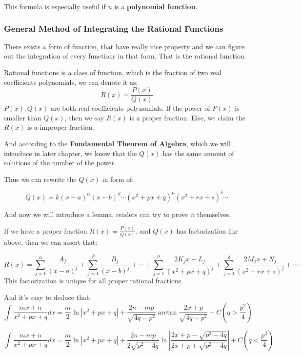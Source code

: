 \documentclass[oneside]{book}
\begin{document}
This formula is especially useful if $u$ is a \textbf{polynomial function}.

\subsubsection{General Method of Integrating the Rational Functions}

There exists a form of function, that have really nice property and we can figure out the integration of every functions in that form. That is the rational function.

\begin{definition}
Rational functions is a class of function, which is the fraction of two real coefficients polynomials, we can denote it as:
\[
R(x) = \frac{P(x)}{Q(x)}
\]
$P(x),Q(x)$ are both real coefficients polynomials. If the power of $P(x)$ is smaller than $Q(x)$, then we say $R(x)$ is a proper fraction. Else, we claim the $R(x)$ is a improper fraction.
\end{definition}

And according to the \textbf{Fundamental Theorem of Algebra}, which we will introduce in later chapter, we know that the $Q(x)$ has the same amount of solutions of the number of the power.

Thus we can rewrite the $Q(x)$ in form of:

\[
Q(x) = k (x-a)^{\alpha} (x-b)^{\beta} \cdots (x^2 + px + q)^{\mu} (x^2 + rx + s)^{\delta} \cdots
\]

And now we will introduce a lemma, readers can try to prove it themselves.

\begin{lemma}
If we have a proper fraction $R(x) = \frac{P(x)}{Q(x)}$. and $Q(x)$ has factorization like above, then we can assert that:

\[
R(x) = \sum_{j=1}^{\alpha} \frac{A_j}{(x-a)^j} + \sum_{j=1}^{\beta} \frac{B_j}{(x-b)^j} + \cdots + \sum_{j=1}^{\mu} \frac{2K_jx + L_j}{(x^2 + px +q)^j} + \sum_{j=1}^{\delta} \frac{2M_jx + N_j}{(x^2 + rx +s)^j} + \cdots
\]
This factorization is unique for all proper rational fractions.
\end{lemma}

And it's easy to deduce that:
\[
\int \frac{mx+n}{x^2 + px + q} dx = \frac{m}{2} \ln |x^2 + px + q| + \frac{2n-mp}{\sqrt{4q - p^2}} \arctan \frac{2x + p}{\sqrt{4q - p^2}} + C (q > \frac{p^2}{4})
\]

\[
\int \frac{mx+n}{x^2 + px + q} dx = \frac{m}{2} \ln |x^2 + px + q| + \frac{2n-mp}{2\sqrt{p^2 - 4q}} \ln \left| \frac{2x + p - \sqrt{p^2 - 4q}}{2x + p + \sqrt{p^2 - 4q}} \right| + C (q < \frac{p^2}{4})
\]
\end{document}
